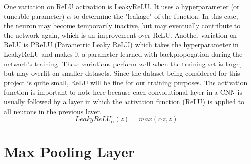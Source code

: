 \documentclass[12pt]{report} %
\begin{document}
	One variation on ReLU activation is LeakyReLU. It uses a hyperparameter (or tuneable parameter) \( \alpha \) to determine the "leakage" of the function. In this case, the neuron may become temporarily inactive, but may eventually contribute to the network again, which is an improvement over ReLU. Another variation on ReLU is PReLU (Parametric Leaky ReLU) which takes the hyperparameter in LeakyReLU and makes it a parameter learned with backpropogation during the network's training. These variations perform well when the training set is large, but may overfit on smaller datasets. Since the dataset being considered for this project is quite small, ReLU will be fine for our training purposes. The activation function is important to note here because each convolutional layer in a CNN is usually followed by a layer in which the activation function (ReLU) is applied to all neurons in the previous layer.\cite{aurelienMachineLearning} 
 \begin{equation}
LeakyReLU_\alpha(z) = max(\alpha z, z)
  \end{equation} 
  
 \section{Max Pooling Layer}
\end{document}
